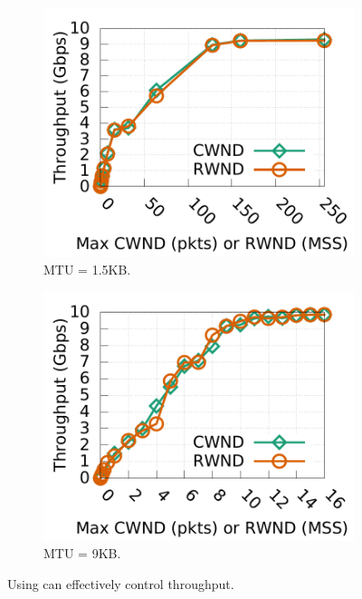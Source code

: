 \begin{figure}[t]
        \centering
        \begin{subfigure}[b]{0.45\textwidth}
                \centering
                \includegraphics[width=\textwidth]{acdctcp/figures/new_enforce/new_tput_cwnd_rwnd_cubic_15k.pdf}
                \caption{MTU = 1.5KB.}
                \label{effectiveness_15k}
        \end{subfigure}
        \begin{subfigure}[b]{0.45\textwidth}
                \centering
                \includegraphics[width=\textwidth]{acdctcp/figures/new_enforce/new_tput_cwnd_rwnd_cubic_9k.pdf}
                \caption{MTU = 9KB.}
                \label{effectiveness_9k}
        \end{subfigure}
        \caption{Using \rwnd{} can effectively control throughput.}
        \label{rwnd_effectiveness}
\end{figure}
